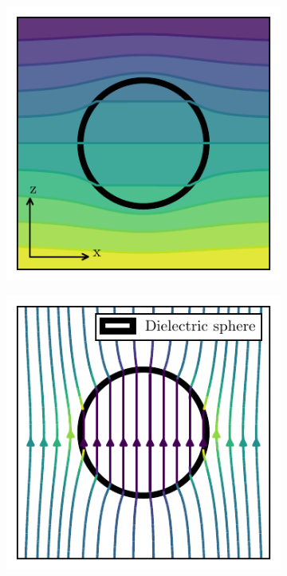 
\begin{figure}[!htbp]
  \centering
  \begin{subfigure}[b]{0.48\textwidth}
      \centering
      \includegraphics[width=\textwidth]{./../figures/potential-dielectric-sphere-small.pdf}
  \end{subfigure}
  \hfill
  \begin{subfigure}[b]{0.48\textwidth}
      \centering
      \includegraphics[width=\textwidth]{./../figures/field-dielectric-sphere-small.pdf}

\end{subfigure}
\end{figure}
